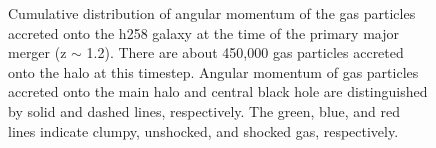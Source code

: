 \documentclass[manuscript]{aastex}
\begin{document}
\begin{figure}
\centerline{}
\caption[]{ Cumulative distribution of angular momentum of the gas particles accreted onto the h258 galaxy at the time of the primary major merger (z $\sim$ 1.2). There are about 450,000 gas particles accreted onto the halo at this timestep. Angular momentum of gas particles accreted onto the main halo and central black hole are distinguished by solid and dashed lines, respectively. The green, blue, and red lines indicate clumpy, unshocked, and shocked gas, respectively.}
\label{hrh258angmom_merger2} 
\end{figure}

\end{document}
